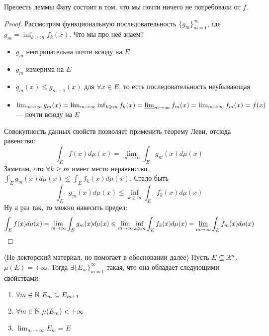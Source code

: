 \begin{note}
	Прелесть леммы Фату состоит в том, что мы почти ничего не потребовали от $f$.
\end{note}

\begin{proof}
	Рассмотрим функциональную последовательность $\{g_m\}_{m = 1}^\infty$, где $g_m = \inf_{k \ge m} f_k(x)$. Что мы про неё знаем?
	\begin{itemize}
		\item $g_m$ неотрицательна почти всюду на $E$
		
		\item $g_m$ измерима на $E$
		
		\item $g_m(x) \le g_{m + 1}(x)$ для $\forall x \in E$, то есть последовательность неубывающая
		
		\item $\lim_{m \to \infty} g_m(x) = \lim_{m \to \infty} \inf_{k \ge m} f_k(x) = \varliminf_{m \to \infty} f_m(x) = \lim_{m \to \infty} f_m(x) = f(x)$ --- почти всюду на $E$
	\end{itemize}
	Совокупность данных свойств позволяет применить теорему Леви, отсюда равенство:
	\[
		\int_E f(x)d\mu(x) = \lim_{m \to \infty} \int_E g_m(x)d\mu(x)
	\]
	Заметим, что $\forall k \ge m$ имеет место неравенство $\int_E g_m(x)d\mu(x) \le \int_E f_k(x)d\mu(x)$. Стало быть
	\[
		\int_E g_m(x)d\mu(x) \le \inf_{k \ge m} \int_E f_k(x)d\mu(x)
	\]
	Ну а раз так, то можно навесить предел:
	\[
		\int_E f(x)d\mu(x) = \lim_{m \to \infty} \int_E g_m(x)d\mu(x) \le \lim_{m \to \infty} \inf_{k \ge m} \int_E f_k(x)d\mu(x) = \varliminf_{m \to \infty} \int_E f_m(x)d\mu(x)
	\]
\end{proof}

\begin{proposition} (Не лекторский материал, но помогает в обосновании далее)
	Пусть $E \subseteq \R^n$, $\mu(E) = +\infty$. Тогда $\exists \{E_m\}_{m = 1}^\infty$ такая, что она обладает следующими свойствами:
	\begin{enumerate}
		\item $\forall m \in \N\ E_m \subseteq E_{m + 1}$
		
		\item $\forall m \in \N\ \mu(E_m) < +\infty$
		
		\item $\lim_{m \to \infty} E_m = E$
	\end{enumerate}
\end{proposition}

